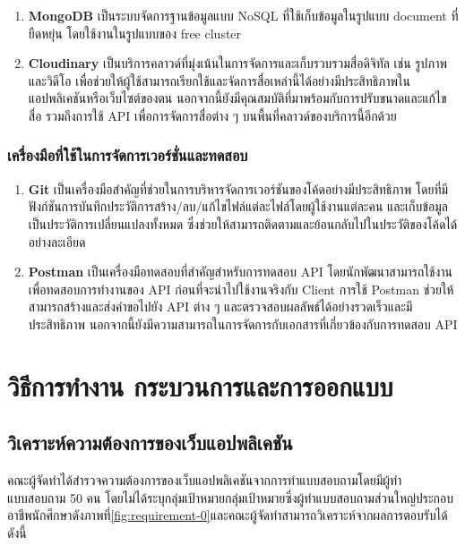 \documentclass[12pt,oneside,openright,a4paper]{cpe-thai-project}
\begin{document}
\begin{enumerate}
  \item \textbf{MongoDB} เป็นระบบจัดการฐานข้อมูลแบบ NoSQL ที่ใช้เก็บข้อมูลในรูปแบบ document ที่ยืดหยุ่น โดยใช้งานในรูปแบบของ free cluster
  \item \textbf{Cloudinary} เป็นบริการคลาวด์ที่มุ่งเน้นในการจัดการและเก็บรวบรวมสื่อดิจิทัล เช่น รูปภาพและวิดีโอ เพื่อช่วยให้ผู้ใช้สามารถเรียกใช้และจัดการสื่อเหล่านี้ได้อย่างมีประสิทธิภาพในแอปพลิเคชันหรือเว็บไซต์ของตน นอกจากนี้ยังมีคุณสมบัติที่มาพร้อมกับการปรับขนาดและแก้ไขสื่อ รวมถึงการใช้ API เพื่อการจัดการสื่อต่าง ๆ บนพื้นที่คลาวด์ของบริการนี้อีกด้วย
\end{enumerate}

\subsection{เครื่องมือที่ใช้ในการจัดการเวอร์ชั่นและทดสอบ}

\begin{enumerate}
  \item \textbf{Git} เป็นเครื่องมือสำคัญที่ช่วยในการบริหารจัดการเวอร์ชันของโค้ดอย่างมีประสิทธิภาพ โดยที่มีฟังก์ชันการบันทึกประวัติการสร้าง/ลบ/แก้ไขไฟล์แต่ละไฟล์โดยผู้ใช้งานแต่ละคน และเก็บข้อมูลเป็นประวัติการเปลี่ยนแปลงทั้งหมด ซึ่งช่วยให้สามารถติดตามและย้อนกลับไปในประวัติของโค้ดได้อย่างละเอียด
  \item \textbf{Postman} เป็นเครื่องมือทดสอบที่สำคัญสำหรับการทดสอบ API โดยนักพัฒนาสามารถใช้งานเพื่อทดสอบการทำงานของ API ก่อนที่จะนำไปใช้งานจริงกับ Client การใช้ Postman ช่วยให้สามารถสร้างและส่งคำขอไปยัง API ต่าง ๆ และตรวจสอบผลลัพธ์ได้อย่างรวดเร็วและมีประสิทธิภาพ นอกจากนี้ยังมีความสามารถในการจัดการกับเอกสารที่เกี่ยวข้องกับการทดสอบ API
\end{enumerate}

\chapter{วิธีการทำงาน กระบวนการและการออกแบบ}


\section{วิเคราะห์ความต้องการของเว็บแอปพลิเคชัน}
\hspace {18pt} คณะผู้จัดทำได้สำรวจความต้องการของเว็บแอปพลิเคชันจากการทำแบบสอบถามโดยมีผู้ทำแบบสอบถาม 50 คน โดยไม่ได้ระบุกลุ่มเป้าหมายกลุ่มเป้าหมายซึ่งผู้ทำแบบสอบถามส่วนใหญ่ประกอบอาชีพนักศึกษาดังภาพที่\ref{fig:requirement-0}และคณะผู้จัดทำสามารถวิเคราะห์จากผลการตอบรับได้ดังนี้
\end{document}

